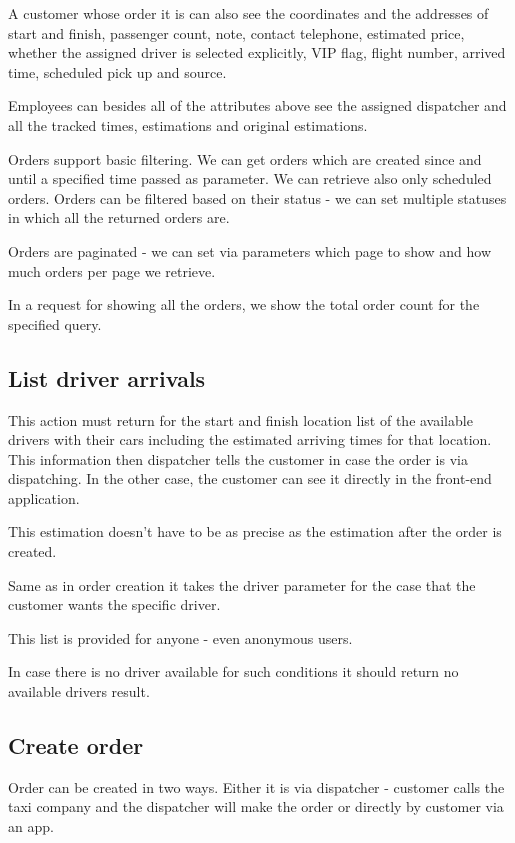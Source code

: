 			A customer whose order it is can also see the coordinates and the addresses of start and finish, passenger count, note, contact telephone, estimated price, whether the assigned driver is selected explicitly, VIP flag, flight number, arrived time, scheduled pick up and source.
			
			Employees can besides all of the attributes above see the assigned dispatcher and all the tracked times, estimations and original estimations.
			
			Orders support basic filtering. We can get orders which are created since and until a specified time passed as parameter. We can retrieve also only scheduled orders. Orders can be filtered based on their status - we can set multiple statuses in which all the returned orders are.
			
			Orders are paginated - we can set via parameters which page to show and how much orders per page we retrieve.
			
			In a request for showing all the orders, we show the total order count for the specified query.
			
		\subsection{List driver arrivals}
		This action must return for the start and finish location list of the available drivers with their cars including the estimated arriving times for that location. This information then dispatcher tells the customer in case the order is via dispatching. In the other case, the customer can see it directly in the front-end application.
		
		This estimation doesn't have to be as precise as the estimation after the order is created.
		
		Same as in order creation it takes the driver parameter for the case that the customer wants the specific driver.
		
		This list is provided for anyone - even anonymous users.
		
		In case there is no driver available for such conditions it should return no available drivers result.
		\subsection{Create order}
			Order can be created in two ways. Either it is via dispatcher - customer calls the taxi company and the dispatcher will make the order or directly by customer via an app. 
			
